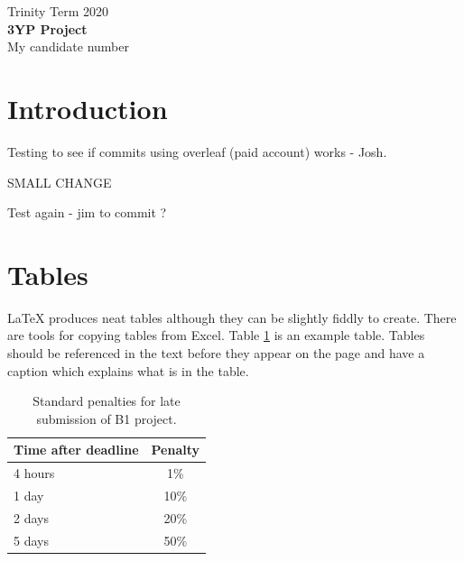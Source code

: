 \documentclass[11pt]{article}
\begin{document}
\begin{center}
\vspace*{2cm}
Trinity Term 2020\\ %
\vspace*{6cm}
 \huge{\textbf{{}3YP Project}}\\ 
\vspace*{6cm}
{\large{My candidate number}} %
\thispagestyle{empty} %


\end{center}

\newpage

\setcounter{page}{1}

\section{Introduction}
Testing to see if commits using overleaf (paid account) works - Josh.

SMALL CHANGE

Test again - jim to commit ?




\section{Tables}

\LaTeX{} produces neat tables although they can be slightly fiddly to create. There are tools for copying tables from Excel. Table \ref{tab:latesubpen} is an example table. Tables should be referenced in the text before they appear on the page and have a caption which explains what is in the table.
\begin{table}[h] %
\begin{center}
\begin{tabular}{ |l|c| } 
 \hline
  Time after deadline & Penalty  \\ 
  \hline
 4 hours & 1\%  \\ 
 1 day & 10\%  \\ 
 2 days & 20\%  \\ 
 5 days & 50\%\\
 \hline
\end{tabular}
\end{center}
\label{tab:latesubpen}
\caption{Standard penalties for late submission of B1 project.}
\end{table}
\end{document}
